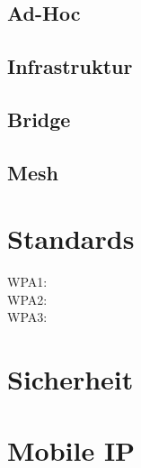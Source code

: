 \documentclass[12pt,a4paper]{article}
\begin{document}
	\subsection*{Ad-Hoc}

	\subsection*{Infrastruktur}

	\subsection*{Bridge}

	\subsection*{Mesh}

\section{Standards}
	\begin{description}
		\item[WPA1:] 
		\item[WPA2:]
		\item[WPA3:]    
	\end{description}

\section{Sicherheit}


\section{Mobile IP}
\end{document}
